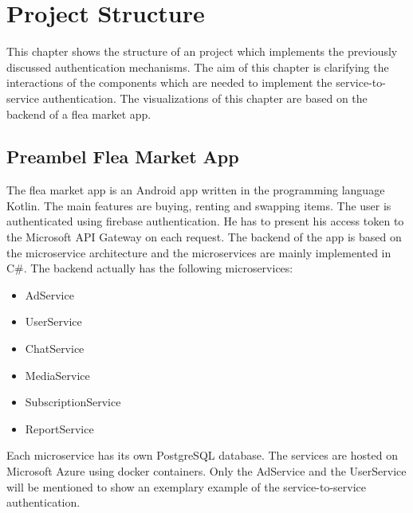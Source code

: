 \chapter{Project Structure}
\label{cha:project_structure}
This chapter shows the structure of an project which implements the previously discussed authentication mechanisms.
The aim of this chapter is clarifying the interactions of the components which are needed to implement the service-to-service authentication.
The visualizations of this chapter are based on the backend of a flea market app.

\section{Preambel Flea Market App}
The flea market app is an Android app written in the programming language Kotlin.
The main features are buying, renting and swapping items.
The user is authenticated using firebase authentication.
He has to present his access token to the Microsoft API Gateway on each request.
The backend of the app is based on the microservice architecture and the microservices are mainly implemented in C\#.
The backend actually has the following microservices:
\begin{itemize}
	\item AdService
	\item UserService
	\item ChatService
	\item MediaService
	\item SubscriptionService
	\item ReportService
\end{itemize}
Each microservice has its own PostgreSQL database.
The services are hosted on Microsoft Azure using docker containers.
Only the AdService and the UserService will be mentioned to show an exemplary example of the service-to-service authentication. 

